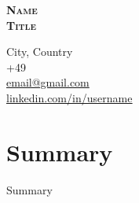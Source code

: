\documentclass[a4,11pt]{article}
\begin{document}
\begin{minipage}[c]{0.62\textwidth}
    \raggedright
    \textbf{\Huge \scshape Name} \\[10pt]
    \textbf{\Large \scshape Title}
\end{minipage}%
\begin{minipage}[c]{0.38\textwidth}
    \raggedleft
    \small City, Country\\ [3pt]
    \small +49 \\ [3pt]
    \href{mailto:email@gmail.com}{\small email@gmail.com}\\ [3pt]
    \href{https://www.linkedin.com/in/username/}{\small \underline{linkedin.com/in/username}}
\end{minipage} \vspace*{-15pt}

%

\section{Summary}
    \leftskip=0.15in \small Summary
\end{document}
